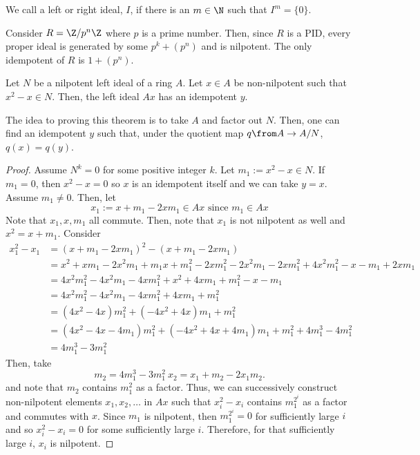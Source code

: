 \documentclass[11pt,leqno,oneside]{amsbook}
\numberwithin{thm}{section}
\begin{document}
\begin{defn}
  We call a left or right ideal, \(I\),  if there is an \(m
  \in \N\) such that \(I^m = \{0\}\).
\end{defn}
\begin{example}
  Consider \(R = \Z/p^n \Z\) where \(p\) is a prime number. Then,
  since \(R\) is a PID, every proper ideal is generated by some \(p^k
  + (p^n)\) and is nilpotent. The only idempotent of \(R\) is \(1 + (p^n)\).
\end{example}
\begin{thm}
  Let \(N\) be a nilpotent left ideal of a ring \(A\). Let \(x \in A\)
  be non-nilpotent such that \(x^2-x \in N\). Then, the left ideal
  \(Ax\) has an idempotent \(y\).
\end{thm}
The idea to proving this theorem is to take \(A\) and factor out
\(N\). Then, one can find an idempotent \(y\) such that, under the quotient
map \(q \from A \to A/N\), \(q(x) = q(y)\).
\begin{proof}
  Assume \(N^k = 0\) for some positive integer \(k\). Let \(m_1 :=
  x^2-x \in N\). If \(m_1 = 0\), then \(x^2-x = 0\) so \(x\) is an
  idempotent itself and we can take \(y = x\). \\

  Assume \(m_1 \neq 0\). Then, let \[
    x_1 := x + m_1 - 2xm_1 \in Ax \text{ since }m_1 \in Ax
  \]
  Note that \(x_1,x,m_1\) all commute. Then, note that \(x_1\) is not nilpotent
  as well and \(x^2 = x + m_1\). Consider
  \begin{align*}
    x_1^2 - x_1
    & = (x+m_1-2xm_1)^2 - (x+m_1-2xm_1) \\
    & = x^2 + xm_1 - 2x^2m_1 + m_1 x + m_1^2 -2xm_1^2 - 2x^2m_1 -
      2xm_1^2 + 4 x^2 m_1^2 - x - m_1 + 2x m_1 \\
    & = 4x^2 m_1^2 - 4x^2 m_1 - 4x m_1^2 + x^2 + 4xm_1 + m_1^2 - x - m_1 \\
    & = 4x^2 m_1^2 - 4x^2 m_1 - 4x m_1^2 + 4xm_1 + m_1^2 \\
    & = (4x^2-4x)m_1^2 + (-4x^2+4x)m_1 + m_1^2 \\
    & = (4x^2-4x-4m_1)m_1^2 + (-4x^2+4x+4m_1)m_1 + m_1^2 + 4m_1^3 - 4m_1^2 \\
    & = 4m_1^3 - 3m_1^2
  \end{align*}
  Then, take \[
    m_2 = 4m_1^3 - 3m_1^2 \ x_2 = x_1 + m_2 - 2x_1 m_2.
  \]
  and note that \(m_2\) contains \(m_1^2\) as a factor. Thus, we can
  successively construct non-nilpotent elements \(x_1, x_2, \ldots\)
  in \(Ax\) such that \(x_i^2 - x_i\) contains \(m_1^{2^i}\) as a
  factor and commutes with \(x\). Since \(m_1\) is nilpotent, then
  \(m_1^{2^i} = 0\) for sufficiently large \(i\) and so \(x_i^2 - x_i
  = 0\) for some sufficiently large \(i\). Therefore, for that
  sufficiently large \(i\), \(x_i\) is nilpotent.
  \end{proof}
\end{document}
